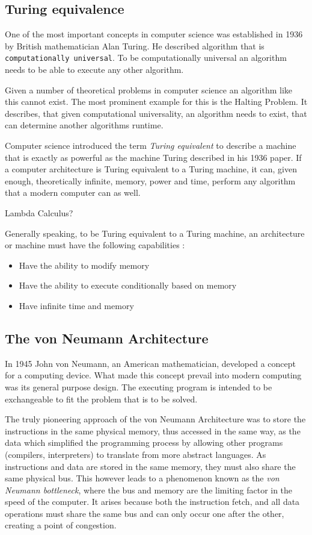 \subsection{Turing equivalence}
One of the most important concepts in computer science was established in 1936 by British mathematician Alan Turing. He described algorithm that is \texttt{computationally universal}. To be computationally universal an algorithm needs to be able to execute any other algorithm. \cite{britannicaturing} 

Given a number of theoretical problems in computer science an algorithm like this cannot exist. The most prominent example for this is the Halting Problem. It describes, that given computational universality, an algorithm needs to exist, that can determine another algorithms runtime. \cite{haltingproblem}

Computer science introduced the term \textit{Turing equivalent} to describe a machine that is exactly as powerful as the machine Turing described in his 1936 paper. If a computer architecture is Turing equivalent to a Turing machine, it can, given enough, theoretically infinite, memory, power and time, perform any algorithm that a modern computer can as well.

Lambda Calculus?

Generally speaking, to be Turing equivalent to a Turing machine, an architecture or machine must have the following capabilities \cite{beneaterturing}:
\begin{itemize}
  \item Have the ability to modify memory
  \item Have the ability to execute conditionally based on memory
  \item Have infinite time and memory
\end{itemize}


\subsection{The von Neumann Architecture}
In 1945 John von Neumann, an American mathematician, developed a concept for a computing device. What made this concept prevail into modern computing was its general purpose design. The executing program is intended to be exchangeable to fit the problem that is to be solved.

The truly pioneering approach of the von Neumann Architecture was to store the instructions in the same physical memory, thus accessed in the same way, as the data which simplified the programming process by allowing other programs (compilers, interpreters) to translate from more abstract languages. As instructions and data are stored in the same memory, they must also share the same physical bus. This however leads  to a phenomenon known as the \textit{von Neumann bottleneck}, where the bus and memory are the limiting factor in the speed of the computer. It arises because both the instruction fetch, and all data operations must share the same bus and can only occur one after the other, creating a point of congestion. 

